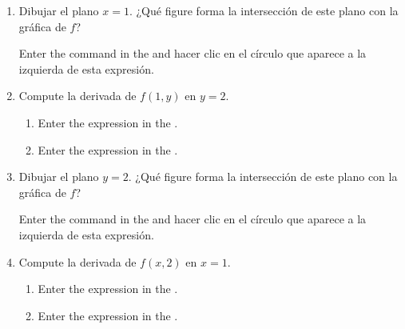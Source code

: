 \begin{enumerate}[leftmargin=*]
\begin{enumerate}
\begin{indication}
            \end{indication}


      \item Dibujar el plano $x=1$. ¿Qué figure forma la intersección de este plano con la gráfica de $f$?
            \begin{indication}
            Enter the command  in the  and hacer clic en el círculo que aparece a la izquierda de esta expresión.
            \end{indication}

      \item Compute la derivada de $f(1,y)$ en $y=2$.
            \begin{indication}
            \begin{enumerate}
            \item Enter the expression  in the .
            \item Enter the expression  in the .
            \end{enumerate}
            \end{indication}

      \item Dibujar el plano $y=2$. ¿Qué figure forma la intersección de este plano con la gráfica de $f$?
            \begin{indication}
            Enter the command  in the  and hacer clic en el círculo que aparece a la izquierda de esta expresión.
            \end{indication}

      \item Compute la derivada de $f(x,2)$ en $x=1$.
            \begin{indication}
            \begin{enumerate}
            \item Enter the expression  in the .
            \item Enter the expression  in the .
            \end{enumerate}
            \end{indication}


\end{enumerate}
\end{enumerate}

